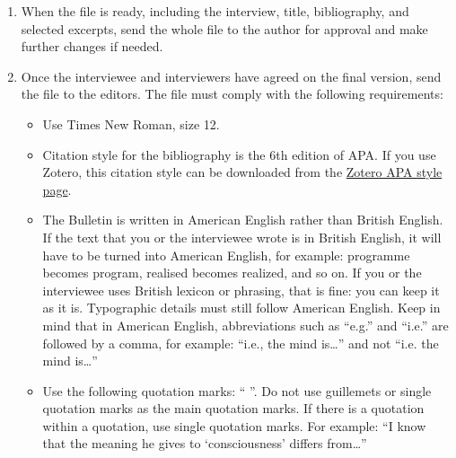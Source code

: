 \documentclass[11pt]{article}
\begin{document}
\begin{enumerate}
\begin{itemize}[label=\textendash,leftmargin=1.5em]
  \item Give a title to the interview. It is better to discuss this directly with the interviewee, as you will need their final agreement on the title and the content of the interview.
  \item Write a short abstract, under 200 words, and up to five keywords for referencing the interview. You will need the interviewee's final agreement on these.
  \item If the interviewee discusses books or articles in the interview, insert a bibliography at the end of the interview where all books and articles mentioned by you, in your questions, or by the interviewee, in their responses, are referenced.
  \item Select two to six excerpts, depending on the length of the interview, highlighting key points made by the interviewee and nicely epitomizing their ideas. These passages must be no longer than one or two sentences. Insert the selected excerpts at the very end of the text.
  \end{itemize}
\item When the file is ready, including the interview, title, bibliography, and selected excerpts, send the whole file to the author for approval and make further changes if needed.
\item Once the interviewee and interviewers have agreed on the final version, send the file to the editors. The file must comply with the following requirements:
  \begin{itemize}[label=\textendash,leftmargin=1.5em]
  \item Use Times New Roman, size 12.
  \item Citation style for the bibliography is the 6th edition of APA. If you use Zotero, this citation style can be downloaded from the \href{https://www.zotero.org/styles?q=id%3Aapa}{Zotero APA style page}.
  \item The Bulletin is written in American English rather than British English. If the text that you or the interviewee wrote is in British English, it will have to be turned into American English, for example: programme becomes program, realised becomes realized, and so on. If you or the interviewee uses British lexicon or phrasing, that is fine: you can keep it as it is. Typographic details must still follow American English. Keep in mind that in American English, abbreviations such as ``e.g.'' and ``i.e.'' are followed by a comma, for example: ``i.e., the mind is\ldots'' and not ``i.e. the mind is\ldots''
  \item Use the following quotation marks: `` ''. Do not use guillemets or single quotation marks as the main quotation marks. If there is a quotation within a quotation, use single quotation marks. For example: ``I know that the meaning he gives to `consciousness' differs from\ldots''

\end{itemize}
\end{enumerate}
\end{document}
